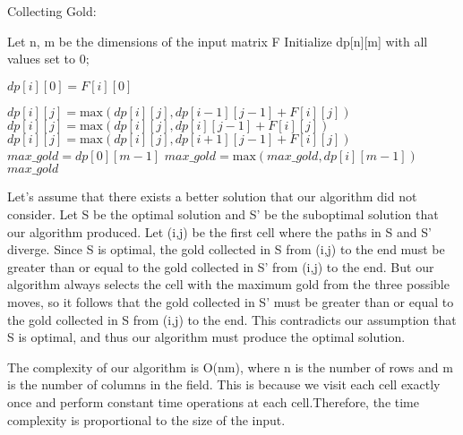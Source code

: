 \documentclass[fleqn,10pt]{olplainarticle}
\begin{document}
\begin{algorithm}
    \caption{Collecting Gold:}
    \begin{algorithmic}[1]
    \State Let n, m be the dimensions of the input matrix F
    \State Initialize dp[n][m] with all values set to 0;

        \State $dp[i][0] =  F[i][0]$
    \EndFor
    
                \State $dp[i][j] = \text{max}(dp[i][j], dp[i-1][j-1] + F[i][j])$
            \EndIf
            \State $dp[i][j] = \text{max}(dp[i][j], dp[i][j-1] + F[i][j])$
                \State $dp[i][j] = \text{max}(dp[i][j], dp[i+1][j-1] + F[i][j])$
            \EndIf
        \EndFor
    \EndFor
    \State $max\_gold = dp[0][m-1]$
        \State $max\_gold = \text{max}(max\_gold, dp[i][m-1])$
    \EndFor
    \State \Return $max\_gold$
\end{algorithmic}

\end{algorithm}

Let's assume that there exists a better solution that our algorithm did not consider. Let S be the optimal solution and S' be the suboptimal solution that our algorithm produced. Let (i,j) be the first cell where the paths in S and S' diverge. Since S is optimal, the gold collected in S from (i,j) to the end must be greater than or equal to the gold collected in S' from (i,j) to the end. But our algorithm always selects the cell with the maximum gold from the three possible moves, so it follows that the gold collected in S' must be greater than or equal to the gold collected in S from (i,j) to the end. This contradicts our assumption that S is optimal, and thus our algorithm must produce the optimal solution.

The complexity of our algorithm is O(nm), where n is the number of rows and m is the number of columns in the field. This is because we visit each cell exactly once and perform constant time operations at each cell.Therefore, the time complexity is proportional to the size of the input. 
\end{document}
